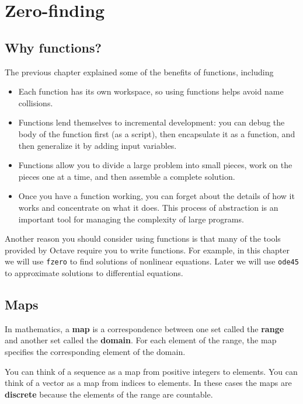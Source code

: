 \documentclass{book}
\begin{document}
\chapter{Zero-finding}


\section{Why functions?}

The previous chapter explained some of the benefits of functions,
including

\begin{itemize}

\item Each function has its own workspace, so using functions helps
avoid name collisions.

\item Functions lend themselves to incremental development: you can
debug the body of the function first (as a script), then encapsulate
it as a function, and then generalize it by adding input variables.

\item Functions allow you to divide a large problem into small
pieces, work on the pieces one at a time, and then assemble a
complete solution.

\item Once you have a function working, you can forget about the
details of how it works and concentrate on what it does. This
process of abstraction is an important tool for managing the
complexity of large programs.

\end{itemize}

Another reason you should consider using functions is that many of the
tools provided by Octave require you to write functions. For example,
in this chapter we will use {\tt fzero} to find solutions of nonlinear
equations. Later we will use {\tt ode45} to approximate solutions to
differential equations.


\section{Maps}
\label{map}

In mathematics, a {\bf map} is a correspondence between one
set called the {\bf range} and another set called the
{\bf domain}. For each element of the range, the map specifies
the corresponding element of the domain.

You can think of a sequence as a map from positive integers
to elements. You can think of a vector
as a map from indices to elements. In these cases the maps
are {\bf discrete} because the elements of the range are countable.
\end{document}
